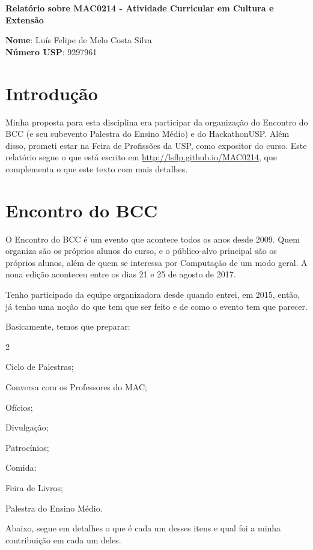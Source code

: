 \documentclass[12pt,letterpaper]{article}
\begin{document}
	\begin{center}
		\Large \bf
		Relatório sobre MAC0214 - Atividade Curricular em Cultura e Extensão
	\end{center}
	
	\textbf{Nome}: Luís Felipe de Melo Costa Silva \\
	\textbf{Número USP}: 9297961
	
	\section*{Introdução}
	Minha proposta para esta disciplina era participar da organização do Encontro do BCC (e seu subevento Palestra do Ensino Médio) e do HackathonUSP. Além disso, prometi estar na Feira de Profissões da USP, como expositor do curso. Este relatório segue o que está escrito em \url{http://lsflp.github.io/MAC0214}, que complementa o que este texto com mais detalhes.
	
	\section{Encontro do BCC}
	O Encontro do BCC é um evento que acontece todos os anos desde 2009. Quem organiza são os próprios alunos do curso, e o público-alvo principal são os próprios alunos, além de quem se interessa por Computação de um modo geral. A nona edição aconteceu entre os dias 21 e 25 de agosto de 2017.
	
	Tenho participado da equipe organizadora desde quando entrei, em 2015, então, já tenho uma noção do que tem que ser feito e de como o evento tem que parecer. 
	
	Basicamente, temos que preparar:
	
	\begin{itemize}
	\end{itemize}

	Abaixo, segue em detalhes o que é cada um desses itens e qual foi a minha contribuição em cada um deles.
	
\end{document}
